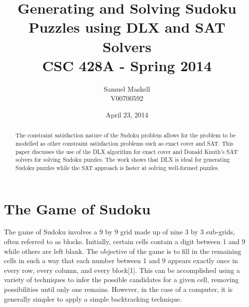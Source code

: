 \documentclass[12pt]{article}
\title{Generating and Solving Sudoku Puzzles using DLX and SAT Solvers\\CSC 428A - Spring 2014}
\date{April 23, 2014}
\author{Samuel Maskell\\ V00700592}
\newcounter{row}
\newcounter{col}
\begin{document}
\begin{titlepage}
\maketitle
\thispagestyle{empty}
\null
\vfill
\begin{abstract}
\noindent{}The constraint satisfaction nature of the Sudoku problem allows for the problem to be modelled as other constraint satisfaction problems such as exact cover and SAT. This paper discusses the use of the DLX algorithm for exact cover and Donald Knuth's SAT solvers for solving Sudoku puzzles. The work shows that DLX is ideal for generating Sudoku puzzles while the SAT approach is faster at solving well-formed puzzles.
\end{abstract}
\end{titlepage}
\pagestyle{fancy}
\section{The Game of Sudoku}
The game of Sudoku involves a 9 by 9 grid made up of nine 3 by 3 sub-grids, often referred to as blocks. Initially, certain cells contain a digit between 1 and 9 while others are left blank. The objective of the game is to fill in the remaining cells in such a way that each number between 1 and 9 appears exactly once in every row, every column, and every block[1]. This can be accomplished using a variety of techniques to infer the possible candidates for a given cell, removing possibilities until only one remains. However, in the case of a computer, it is generally simpler to apply a simple backtracking technique. \\
\end{document}
